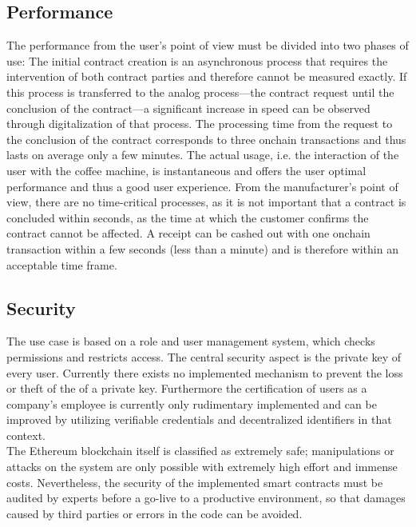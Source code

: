 \documentclass[conference]{IEEEtran}
\begin{document}
\subsection{Performance}
The performance from the user's point of view must be divided into two phases of use: The initial contract creation is an asynchronous process that requires the intervention of both contract parties and therefore cannot be measured exactly. If this process is transferred to the analog process---the contract request until the conclusion of the contract---a significant increase in speed can be observed through digitalization of that process. The processing time from the request to the conclusion of the contract corresponds to three onchain transactions and thus lasts on average only a few minutes. The actual usage, i.e. the interaction of the user with the coffee machine, is instantaneous and offers the user optimal performance and thus a good user experience. From the manufacturer's point of view, there are no time-critical processes, as it is not important that a contract is concluded within seconds, as the time at which the customer confirms the contract cannot be affected. A receipt can be cashed out with one onchain transaction within a few seconds (less than a minute) and is therefore within an acceptable time frame. 


\subsection{Security}
The use case is based on a role and user management system, which checks permissions and restricts access. The central security aspect is the private key of every user. Currently there exists no implemented mechanism to prevent the loss or theft of the of a private key. Furthermore the certification of users as a company's employee is currently only rudimentary implemented and can be improved by utilizing verifiable credentials and decentralized identifiers in that context.\\
The Ethereum blockchain itself is classified as extremely safe; manipulations or attacks on the system are only possible with extremely high effort and immense costs. Nevertheless, the security of the implemented smart contracts must be audited by experts before a go-live to a productive environment, so that damages caused by third parties or errors in the code can be avoided.
\end{document}
